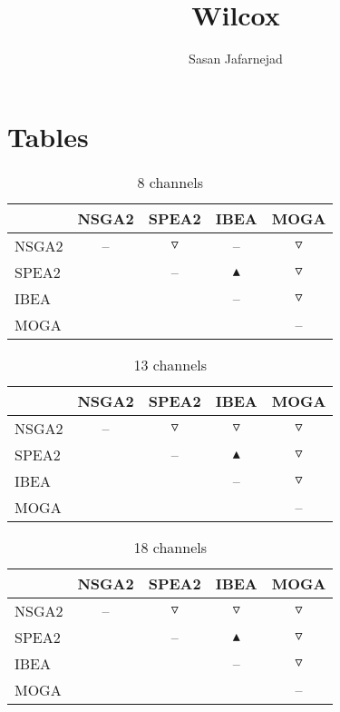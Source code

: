 \documentclass{article}
\title{Wilcox}
\author{Sasan Jafarnejad}
\begin{document}
 \maketitle
 \section{Tables}
 \begin{table}
 \caption {8 channels} \label{tab:title} 
 \centering \begin{tabular}{l c c c c }
  \hline & NSGA2 & SPEA2 & IBEA & MOGA \\
 \hline  NSGA2 &  --  & $\triangledown$ &  --  & $\triangledown$ \\
  SPEA2 &   &  --  & $\blacktriangle$ & $\triangledown$ \\
  IBEA &   &   &  --  & $\triangledown$ \\
  MOGA &   &   &   &  --  \\
 \hline
 \end{tabular}
 \end{table}
  \begin{table}
   \caption {13 channels} \label{tab:title} 
  \centering \begin{tabular}{l c c c c }
   \hline & NSGA2 & SPEA2 & IBEA & MOGA \\
  \hline  NSGA2 &  --  & $\triangledown$ & $\triangledown$ & $\triangledown$ \\
   SPEA2 &   &  --  & $\blacktriangle$ & $\triangledown$ \\
   IBEA &   &   &  --  & $\triangledown$ \\
   MOGA &   &   &   &  --  \\
  \hline
  \end{tabular}
  \end{table}
   \begin{table}
    \caption {18 channels} \label{tab:title} 
   \centering \begin{tabular}{l c c c c }
    \hline & NSGA2 & SPEA2 & IBEA & MOGA \\
   \hline  NSGA2 &  --  & $\triangledown$ & $\triangledown$ & $\triangledown$ \\
    SPEA2 &   &  --  & $\blacktriangle$ & $\triangledown$ \\
    IBEA &   &   &  --  & $\triangledown$ \\
    MOGA &   &   &   &  --  \\
   \hline
   \end{tabular}
   \end{table}
\end{document}
